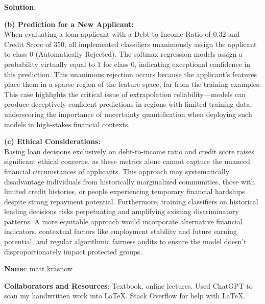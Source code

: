 \documentclass[submit]{../harvardml}
\newenvironment{solution}{
    \vspace{2mm}
    \color{blue}\noindent\textbf{Solution}:
}{}
\begin{document}
\begin{solution}
\begin{tcolorbox}[colback=white,breakable]
  \vspace{2mm}
  \textbf{(b) Prediction for a New Applicant:} \\
  When evaluating a loan applicant with a Debt to Income Ratio of 0.32 and Credit Score of 350, all implemented classifiers unanimously assign the applicant to class 0 (Automatically Rejected). The softmax regression models assign a probability virtually equal to 1 for class 0, indicating exceptional confidence in this prediction. This unanimous rejection occurs because the applicant's features place them in a sparse region of the feature space, far from the training examples. This case highlights the critical issue of extrapolation reliability—models can produce deceptively confident predictions in regions with limited training data, underscoring the importance of uncertainty quantification when deploying such models in high-stakes financial contexts.
  
  \vspace{2mm}
  \textbf{(c) Ethical Considerations:} \\
  Basing loan decisions exclusively on debt-to-income ratio and credit score raises significant ethical concerns, as these metrics alone cannot capture the nuanced financial circumstances of applicants. This approach may systematically disadvantage individuals from historically marginalized communities, those with limited credit histories, or people experiencing temporary financial hardships despite strong repayment potential. Furthermore, training classifiers on historical lending decisions risks perpetuating and amplifying existing discriminatory patterns. A more equitable approach would incorporate alternative financial indicators, contextual factors like employment stability and future earning potential, and regular algorithmic fairness audits to ensure the model doesn't disproportionately impact protected groups.
  
  \end{tcolorbox}
  \end{solution}

\newpage
\newpage

\textbf{Name}: matt krasnow

\textbf{Collaborators and Resources}: Textbook, online lectures. Used ChatGPT to scan my handwritten work into LaTeX. Stack Overflow for help with LaTeX.
\end{document}
